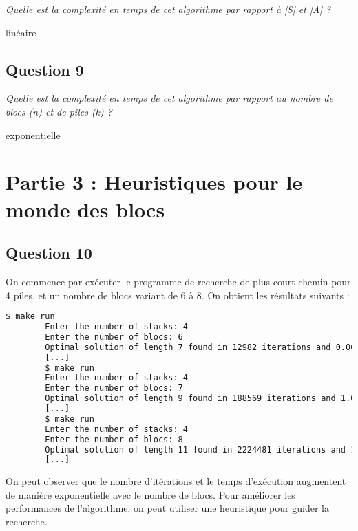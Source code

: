 \textit{Quelle est la complexité en temps de cet algorithme par rapport à |S| et |A| ?}

linéaire

\subsection{Question 9}

\textit{Quelle est la complexité en temps de cet algorithme par rapport au nombre de blocs (n) et de piles (k) ?}

exponentielle

\section{Partie 3 : Heuristiques pour le monde des blocs}

\subsection{Question 10}

On commence par exécuter le programme de recherche de plus court chemin pour 4 piles, et un nombre de blocs variant de 6 à 8. On obtient les résultats suivants :

\begin{minipage}{\dimexpr\linewidth-20pt}
    \begin{lstlisting}[language=bash, caption={Résultat de l'algorithme PageRank après convergence sur le graphe $G_2$, avec $\alpha = 0.9$ et $\epsilon = 1.0 \times 10^{-10}$.}]
        $ make run
        Enter the number of stacks: 4
        Enter the number of blocs: 6
        Optimal solution of length 7 found in 12982 iterations and 0.060902 seconds
        [...]
        $ make run
        Enter the number of stacks: 4
        Enter the number of blocs: 7
        Optimal solution of length 9 found in 188569 iterations and 1.04769 seconds
        [...]
        $ make run
        Enter the number of stacks: 4
        Enter the number of blocs: 8
        Optimal solution of length 11 found in 2224481 iterations and 15.6446 seconds
        [...]
    \end{lstlisting}
\end{minipage}

On peut observer que le nombre d'itérations et le temps d'exécution augmentent de manière exponentielle avec le nombre de blocs. Pour améliorer les performances de l'algorithme, on peut utiliser une heuristique pour guider la recherche.

